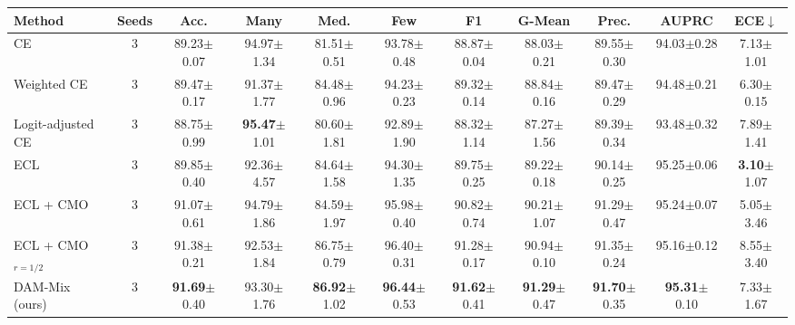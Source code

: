 \begin{tabular}{l c ccccccccc}
\toprule
Method & Seeds & Acc. & Many & Med. & Few & F1 & G-Mean & Prec. & AUPRC & ECE$\downarrow$ \\
\midrule
CE & 3 & 89.23{\scriptsize$\pm$0.07} & 94.97{\scriptsize$\pm$1.34} & 81.51{\scriptsize$\pm$0.51} & 93.78{\scriptsize$\pm$0.48} & 88.87{\scriptsize$\pm$0.04} & 88.03{\scriptsize$\pm$0.21} & 89.55{\scriptsize$\pm$0.30} & 94.03{\scriptsize$\pm$0.28} & 7.13{\scriptsize$\pm$1.01} \\
Weighted CE & 3 & 89.47{\scriptsize$\pm$0.17} & 91.37{\scriptsize$\pm$1.77} & 84.48{\scriptsize$\pm$0.96} & 94.23{\scriptsize$\pm$0.23} & 89.32{\scriptsize$\pm$0.14} & 88.84{\scriptsize$\pm$0.16} & 89.47{\scriptsize$\pm$0.29} & 94.48{\scriptsize$\pm$0.21} & 6.30{\scriptsize$\pm$0.15} \\
Logit-adjusted CE & 3 & 88.75{\scriptsize$\pm$0.99} & \textbf{95.47}{\scriptsize$\pm$1.01} & 80.60{\scriptsize$\pm$1.81} & 92.89{\scriptsize$\pm$1.90} & 88.32{\scriptsize$\pm$1.14} & 87.27{\scriptsize$\pm$1.56} & 89.39{\scriptsize$\pm$0.34} & 93.48{\scriptsize$\pm$0.32} & 7.89{\scriptsize$\pm$1.41} \\
ECL & 3 & 89.85{\scriptsize$\pm$0.40} & 92.36{\scriptsize$\pm$4.57} & 84.64{\scriptsize$\pm$1.58} & 94.30{\scriptsize$\pm$1.35} & 89.75{\scriptsize$\pm$0.25} & 89.22{\scriptsize$\pm$0.18} & 90.14{\scriptsize$\pm$0.25} & 95.25{\scriptsize$\pm$0.06} & \textbf{3.10}{\scriptsize$\pm$1.07} \\
ECL + CMO & 3 & 91.07{\scriptsize$\pm$0.61} & 94.79{\scriptsize$\pm$1.86} & 84.59{\scriptsize$\pm$1.97} & 95.98{\scriptsize$\pm$0.40} & 90.82{\scriptsize$\pm$0.74} & 90.21{\scriptsize$\pm$1.07} & 91.29{\scriptsize$\pm$0.47} & 95.24{\scriptsize$\pm$0.07} & 5.05{\scriptsize$\pm$3.46} \\
ECL + CMO$_{r=1/2}$ & 3 & 91.38{\scriptsize$\pm$0.21} & 92.53{\scriptsize$\pm$1.84} & 86.75{\scriptsize$\pm$0.79} & 96.40{\scriptsize$\pm$0.31} & 91.28{\scriptsize$\pm$0.17} & 90.94{\scriptsize$\pm$0.10} & 91.35{\scriptsize$\pm$0.24} & 95.16{\scriptsize$\pm$0.12} & 8.55{\scriptsize$\pm$3.40} \\
\midrule
DAM-Mix (ours) & 3 & \textbf{91.69}{\scriptsize$\pm$0.40} & 93.30{\scriptsize$\pm$1.76} & \textbf{86.92}{\scriptsize$\pm$1.02} & \textbf{96.44}{\scriptsize$\pm$0.53} & \textbf{91.62}{\scriptsize$\pm$0.41} & \textbf{91.29}{\scriptsize$\pm$0.47} & \textbf{91.70}{\scriptsize$\pm$0.35} & \textbf{95.31}{\scriptsize$\pm$0.10} & 7.33{\scriptsize$\pm$1.67} \\
\bottomrule
\end{tabular}

